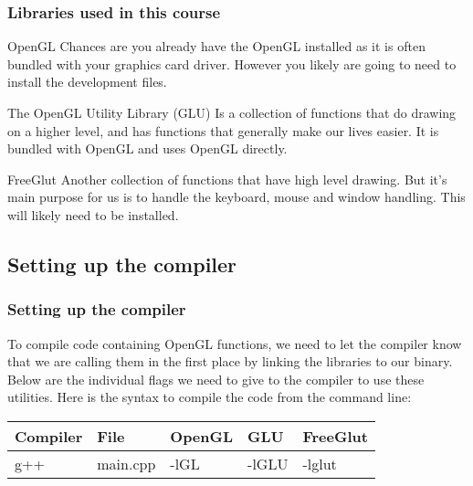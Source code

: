 \documentclass{beamer}
\begin{document}
          \begin{frame}
            \frametitle{Libraries used in this course}
            \begin{block}{OpenGL}
              Chances are you already have the OpenGL installed as it is often bundled with your graphics card driver. However you likely are going to need to install the development files.
            \end{block}

            \begin{block}{The OpenGL Utility Library (GLU)}
              Is a collection of functions that do drawing on a higher level, and has functions that generally make our lives easier. It is bundled with OpenGL and uses OpenGL directly.
            \end{block}

            \begin{block}{FreeGlut}
              Another collection of functions that have high level drawing. But it's main purpose for us is to handle the keyboard, mouse and window handling. This will likely need to be installed.
            \end{block}
          \end{frame}

          \subsection{Setting up the compiler}
          \begin{frame}
            \frametitle{Setting up the compiler}
            To compile code containing OpenGL functions, we need to let the compiler know that we are calling them in the first place by linking the libraries to our binary. Below are the individual flags we need to give to the compiler to use these utilities. Here is the syntax to compile the code from the command line:
            \begin{table}
              \begin{tabular}{l l l l l}
                \toprule
                \textbf{Compiler} & \textbf{File} & \textbf{OpenGL} & \textbf{GLU} & \textbf{FreeGlut}\\
                \midrule
                g++ & main.cpp & -lGL & -lGLU & -lglut \\
                \bottomrule
              \end{tabular}
            \end{table}
          \end{frame}
\end{document}
